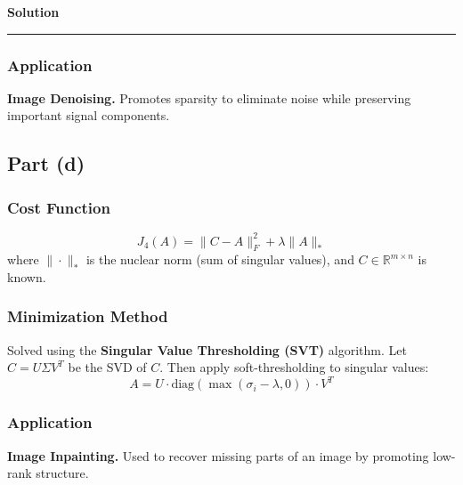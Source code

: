 \documentclass[a4paper,12pt]{article}
\newenvironment{solution}[2][]{%
    \begin{mdframed}[linecolor=blue!70!black, linewidth=2pt, roundcorner=10pt, backgroundcolor=yellow!10!white, skipabove=12pt, skipbelow=12pt]%
        \textbf{\large #2}
        \par\noindent\rule{\textwidth}{0.4pt}
}{
    \end{mdframed}
}
\begin{document}
\begin{solution}{Solution}
\subsubsection{Application}  
\textbf{Image Denoising.} Promotes sparsity to eliminate noise while preserving important signal components.

\subsection{Part (d)}

\subsubsection{Cost Function}
\begin{equation}
J_4(A) = \|C - A\|_F^2 + \lambda \|A\|_*
\end{equation}
where \( \|\cdot\|_* \) is the nuclear norm (sum of singular values), and \( C \in \mathbb{R}^{m \times n} \) is known.

\subsubsection{Minimization Method}  
Solved using the \textbf{Singular Value Thresholding (SVT)} algorithm. Let \( C = U \Sigma V^T \) be the SVD of \( C \). Then apply soft-thresholding to singular values:
\begin{equation}
A = U \cdot \text{diag}(\max(\sigma_i - \lambda, 0)) \cdot V^T
\end{equation}

\subsubsection{Application}  
\textbf{Image Inpainting.} Used to recover missing parts of an image by promoting low-rank structure.

\end{solution}
\end{document}
